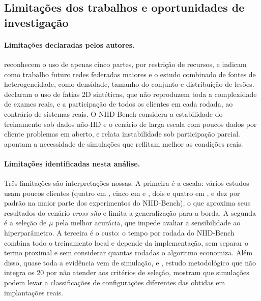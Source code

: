 \subsection{Limitações dos trabalhos e oportunidades de investigação}

\paragraph{Limitações declaradas pelos autores.}
\citet{quintana2026mammography} reconhecem o uso de apenas cinco partes, por restrição de recursos, e indicam como trabalho futuro redes federadas maiores e o estudo combinado de fontes de heterogeneidade, como densidade, tamanho do conjunto e distribuição de lesões. \citet{marella2025fedonco} declaram o uso de fatias 2D sintéticas, que não reproduzem toda a complexidade de exames reais, e a participação de todos os clientes em cada rodada, ao contrário de sistemas reais. O NIID-Bench considera a estabilidade do treinamento sob dados não-IID e o cenário de larga escala com poucos dados por cliente problemas em aberto, e relata instabilidade sob participação parcial. \citet{sevinc2025distribution} apontam a necessidade de simulações que reflitam melhor as condições reais.

\paragraph{Limitações identificadas nesta análise.}
Três limitações são interpretações nossas. A primeira é a escala: vários estudos usam poucos clientes (quatro em \citet{onlu2025aggregation}, cinco em \citet{tan2026instruction} e \citet{marella2025fedonco}, dois e quatro em \citet{quintana2026mammography}, e dez por padrão na maior parte dos experimentos do NIID-Bench), o que aproxima seus resultados do cenário \textit{cross-silo} e limita a generalização para a borda. A segunda é a seleção de $\mu$ pela melhor acurácia, que impede avaliar a sensibilidade ao hiperparâmetro. A terceira é o custo: o tempo por rodada do NIID-Bench combina todo o treinamento local e depende da implementação, sem separar o termo proximal e sem considerar quantas rodadas o algoritmo economiza. Além disso, quase toda a evidência vem de simulação, e \citet{valli2026beyond}, estudo metodológico que não integra os 20 por não atender aos critérios de seleção, mostram que simulações podem levar a classificações de configurações diferentes das obtidas em implantações reais.

